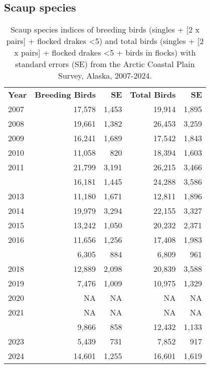 \documentclass[
]{article}
\begin{document}
\subsection*{Scaup species}\label{scaup-species-1}

\begingroup\fontsize{10}{12}\selectfont

\begin{longtable}[t]{lrrrr}

\caption{\label{tbl-UNSC}Scaup species indices of breeding birds
(singles + {[}2 x pairs{]} + flocked drakes \textless5) and total birds
(singles + {[}2 x pairs{]} + flocked drakes \textless5 + birds in
flocks) with standard errors (SE) from the Arctic Coastal Plain Survey,
Alaska, 2007-2024.}

\tabularnewline

\\
\toprule
\textbf{Year} & \textbf{Breeding Birds} & \textbf{SE} & \textbf{Total Birds} & \textbf{SE}\\
\midrule
2007 & 17,578 & 1,453 & 19,914 & 1,895\\
2008 & 19,661 & 1,382 & 26,453 & 3,259\\
2009 & 16,241 & 1,689 & 17,542 & 1,843\\
2010 & 11,058 & 820 & 18,394 & 1,603\\
2011 & 21,799 & 3,191 & 26,215 & 3,466\\
\addlinespace
2012 & 16,181 & 1,445 & 24,288 & 3,586\\
2013 & 11,180 & 1,671 & 12,811 & 1,896\\
2014 & 19,979 & 3,294 & 22,155 & 3,327\\
2015 & 13,242 & 1,050 & 20,232 & 2,371\\
2016 & 11,656 & 1,256 & 17,408 & 1,983\\
\addlinespace
2017 & 6,305 & 884 & 6,809 & 961\\
2018 & 12,889 & 2,098 & 20,839 & 3,588\\
2019 & 7,476 & 1,009 & 10,975 & 1,329\\
2020 & NA & NA & NA & NA\\
2021 & NA & NA & NA & NA\\
\addlinespace
2022 & 9,866 & 858 & 12,432 & 1,133\\
2023 & 5,439 & 731 & 7,852 & 917\\
2024 & 14,601 & 1,255 & 16,601 & 1,619\\
\bottomrule

\end{longtable}
\end{document}
